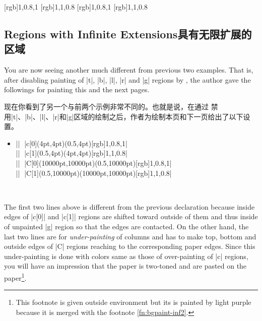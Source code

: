 \newpage \suppressfloats
{}
[rgb]{1,0.8,1}
[rgb]{1,1,0.8}
[rgb]{1,0.8,1}
[rgb]{1,1,0.8}

\subsection{Regions with Infinite Extensions\hfill 具有无限扩展的区域}
\label{sec:bgpaint-inf}

You are now seeing another \bgpaint{} much different from previous two
examples.  That is, after disabling painting of |t|, |b|, |l|, |r| and |g|
regions by \Uidx{\!\nobackgroundcolor!}, the author gave the followings
for painting this and the next pages.

现在你看到了另一个与前两个示例非常不同的\bgpaint{}。也就是说，在通过 \Uidx{\!\nobackgroundcolor!} 禁用|t|、|b|、|l|、|r|和|g|区域的绘制之后，作者为绘制本页和下一页给出了以下设置。

\begin{itemize}\item[]
|\backgroundcolor|
    |{c[0](4pt,4pt)(0.5\columnsep,4pt)}[rgb]{1,0.8,1}|\\
|\backgroundcolor|
    |{c[1](0.5\columnsep,4pt)(4pt,4pt)}[rgb]{1,1,0.8}|\\
|\backgroundcolor|
    |{C[0](10000pt,10000pt)(0.5\columnsep,10000pt)}[rgb]{1,0.8,1}|\\
|\backgroundcolor|
    |{C[1](0.5\columnsep,10000pt)(10000pt,10000pt)}[rgb]{1,1,0.8}|
\end{itemize}

\SpecialUsageIndex{\backgroundcolor}

The first two lines above is different from the previous declaration
because inside edges of |c[0]| and |c[1]| regions are shifted toward
outside of them and thus inside of unpainted |g| region so that the edges
are contacted.  On the other hand, the last two lines are for
\emph{under-painting} of columns and has \emph{\bginfext} to make top,
bottom and outside edges of |C| regions reaching to the corresponding
paper edges.  Since this under-painting is done with colors same as those
of over-painting of |c| regions, you will have an impression that the
paper is two-toned and \pwstuff{} are pasted on the paper\footnote{%
This footnote is given outside  environment but its
\bground{} is painted by light purple because it is merged with the
footnote \ref{fn:bgpaint-inf2}.\label{fn:bgpaint-inf1}}.

